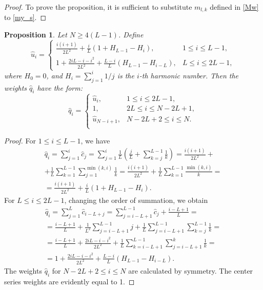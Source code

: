 \documentclass[sii]{ipart}
\newtheorem{proposition}{Proposition}
\begin{document}
\begin{proof}
	To prove the proposition, it is sufficient to substitute $m_{l,k}$ defined in \eqref{Mw} to \eqref{my_s}.
\end{proof}

\begin{proposition} \label{myserweightstat}
	Let $N \ge 4(L-1)$. Define
	\begin{equation*}
	\hat{u}_i = \begin{cases}
	\frac{i(i+1)}{2 L^2} + \frac{i}{L}(1 + H_{L-1} - H_i), &1 \le i \le L-1, \\
	1 + \frac{2iL-i-i^2}{2L^2} + \frac{L-i}{L}(H_{L-1} - H_{i - L}), & L \le i \le 2L-1,
	\end{cases}
	\end{equation*}
	where $H_0 = 0$, and $H_i = \sum_{j=1}^i 1/j$ is the $i$-th harmonic number.
	 Then the weights $\hat{q}_i$ have the form:
	\begin{equation*}
	\hat{q}_i = \begin{cases}
	\hat{u}_i, &1 \le i \le 2L-1, \\
		1, &2L \le i \le N-2L+1,\\
\hat{u}_{N-i+1}, &N-2L+2 \le i \le N. \\
	\end{cases}
	\end{equation*}
\end{proposition}

\begin{proof}
	For $1 \le i \le L-1$, we have
	\begin{multline*}
	\hat{q}_i = \sum_{j=1}^i \hat{c}_j = \sum_{j=1}^i \frac{1}{L}\left(\frac{j}{L} + \sum_{k=j}^{L-1}\frac{1}{k}\right)\! =
	\frac{i(i+1)}{2L^2} + \\ + \frac{1}{L} \sum_{k = 1}^{L-1} \sum_{j=1}^{\min(k,i)} \frac{1}{k} = \frac{i(i+1)}{2L^2}+\frac{1}{L} \sum_{k = 1}^{L-1} \frac{\min(k,i)}{k} = \\ = \frac{i(i+1)}{2 L^2} + \frac{i}{L}(1 + H_{L-1} - H_i).
	\end{multline*}
	For $L \le i \le 2L-1$, changing the order of summation, we obtain
	\begin{multline*}
	\hat{q}_i = \sum_{j = 1}^L \hat{c}_{i-L+j} = \sum_{j = i - L + 1}^{L - 1} \hat{c}_j + \frac{i - L + 1}{L} =\\
	=\frac{i - L + 1}{L} + \frac{1}{L^2} \sum_{j = i - L + 1}^{L-1}j + \frac{1}{L} \sum_{j = i-L + 1}^{L-1} \sum_{k=j}^{L-1}\frac{1}{k} =\\
	=\frac{i - L + 1}{L} + \frac{2iL - i - i^2}{2L^2} + \frac{1}{L} \sum_{k = i - L + 1}^{L - 1} \sum_{j = i - L + 1}^k \frac{1}{k} =\\
	=1 + \frac{2iL-i-i^2}{2L^2} + \frac{L-i}{L}(H_{L-1} - H_{i - L}).
	\end{multline*}
	The weights $\hat{q}_i$ for $N-2L+2 \le i \le N$ are calculated by symmetry. The center series weights are evidently equal to 1.
\end{proof}
\end{document}
